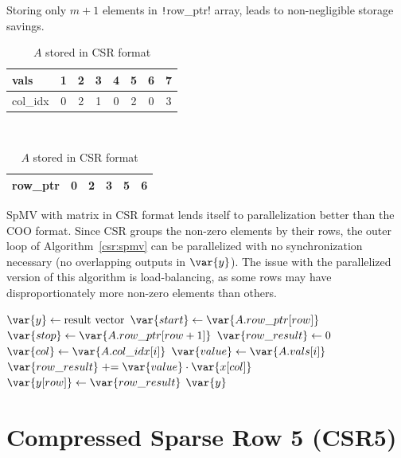 \documentclass[thesis=M,english]{FITthesis}[2019/12/23]
\newcommand{\csre}[1]{\texttt!#1!}
\newcommand{\pluseq}{\mathrel{+}=}
\begin{document}
Storing only $m + 1$ elements in \csre{row_ptr} array, leads to non-negligible storage savings.

\begin{table}[h!]
    \centering
    \begin{tabular}{ |l||c|c|c|c|c|c|c| }
        \hline
        vals     & 1 & 2 & 3 & 4 & 5 & 6 & 7 \\
        \hline
        col\_idx & 0 & 2 & 1 & 0 & 2 & 0 & 3 \\
        \hline
    \end{tabular} \\
    \begin{tabular}{ |l||c|c|c|c|c| }
        \hline
        row\_ptr & 0 & 2 & 3 & 5 & 6 \\
        \hline
    \end{tabular}
    \caption{$A$ stored in CSR format}
\end{table}

SpMV with matrix in CSR format lends itself to parallelization better than the COO format. Since
CSR groups the non-zero elements by their rows, the outer loop of Algorithm~\ref{csr:spmv}
can be parallelized with no synchronization necessary (no overlapping outputs in \(\var{y}\)).
The issue with the parallelized version of this algorithm is load-balancing, as some rows may have
disproportionately more non-zero elements than others.

\begin{algorithm}
    \caption{SpMV for matrix stored in CSR format}\label{csr:spmv}
    \begin{algorithmic}
        \State $\var{y} \gets \text{result vector}$
        \State $\var{start} \gets \var{A.row\_ptr[row]}$
        \State $\var{stop} \gets \var{A.row\_ptr[row + 1]}$
        \State $\var{row\_result} \gets 0$
        \State $\var{col} \gets \var{A.col\_idx[i]}$
        \State $\var{value} \gets \var{A.vals[i]}$
        \State $\var{row\_result} \pluseq \var{value} \cdot \var{x[col]}$
        \EndFor
        \State $\var{y[row]} \gets \var{row\_result}$
        \EndFor
        \Return $\var{y}$
        \EndFunction
    \end{algorithmic}
\end{algorithm}

\section{Compressed Sparse Row 5 (CSR5)}\label{csr5Intro}
\end{document}
